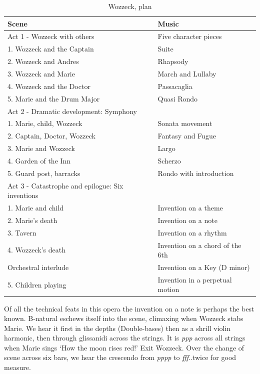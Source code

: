 \begin{table}[h!]
\begin{tabular}{|l|l|} \hline
Scene & Music \\\hline
Act 1 - Wozzeck with others & Five character pieces \\\hline
1. Wozzeck and the Captain & Suite\\
2. Wozzeck and Andres & Rhapsody\\
3. Wozzeck and Marie & March and Lullaby\\
4. Wozzeck and the Doctor & Passacaglia\\
5. Marie and the Drum Major & Quasi Rondo\\\hline
Act 2 - Dramatic development: Symphony\\\hline
1. Marie, child, Wozzeck & Sonata movement\\
2. Captain, Doctor, Wozzeck & Fantasy and Fugue\\
3. Marie and Wozzeck & Largo\\
4. Garden of the Inn & Scherzo\\
5. Guard post, barracks & Rondo with introduction\\\hline
Act 3 - Catastrophe and epilogue: Six inventions\\\hline
1. Marie and child & Invention on a theme\\
2. Marie's death & Invention on a note\\
3. Tavern & Invention on a rhythm\\
4. Wozzeck's death & Invention on a chord of the 6th\\
Orchestral interlude & Invention on a Key (D minor) \\
5. Children playing & Invention in a perpetual motion\\\hline
\end{tabular}
\caption{Wozzeck, plan}
\label{tab:wozzeckplan}
\end{table}

Of all the technical feats in this opera the invention on a note is perhaps the best known. B-natural eschews itself into the scene, climaxing when Wozzeck stabs Marie. We hear it first in the depths (Double-bases) then as a shrill violin harmonic, then through glissanidi across the strings. It is \textit{ppp} across all strings when Marie sings `How the moon rises red!' Exit Wozzeck. Over the change of scene across six bars, we hear the crescendo from \textit{pppp} to \textit{fff}..twice for good measure. 

